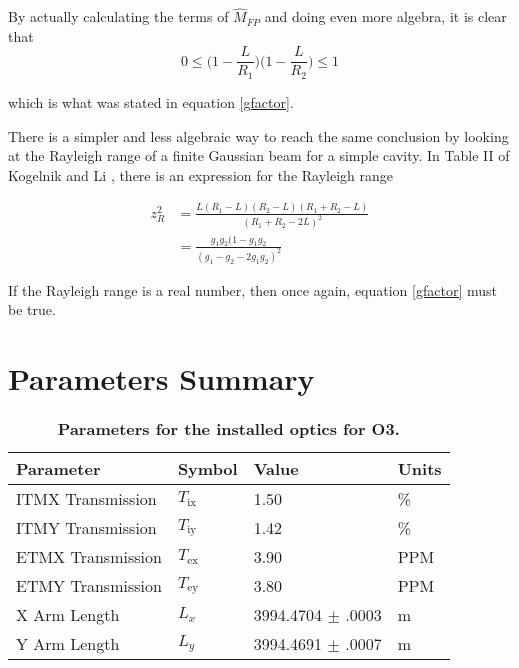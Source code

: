 \begin{appendices}
	By actually calculating the terms of $\hat{M}_{FP}$ and doing even more algebra, it is clear that 
	\begin{equation}
	0 \leq \bigg(1-\frac{L}{R_1}\bigg) \bigg(1-\frac{L}{R_2}\bigg) \leq 1
	\end{equation}
	
	which is what was stated in equation \ref{gfactor}.
	
	There is a simpler and less algebraic way to reach the same conclusion by looking at the Rayleigh range of a finite Gaussian beam for a simple cavity.   In Table II of Kogelnik and Li \cite{Kogelnik}, there is an expression for the Rayleigh range
	
	\begin{equation}
	\begin{aligned}
	z_{R}^2 &= \frac{L (R_1-L) (R_2-L) (R_1+R_2 - L) }  {(R_1+R_2-2L)^2}\\
			&= \frac{g_1 g_2 (1-g_1 g_2}{(g_1 - g_2 - 2 g_1 g_2)^2}
	\end{aligned}
	\end{equation}
	
	If the Rayleigh range is a real number, then once again, equation \ref{gfactor} must be true.
	
	
	\chapter{Parameters Summary}
	
	\begin{table}[h!]
		\centering
		\begin{tabular}{ | l | l | l |l |}
			\hline
			\textbf{Parameter} & \textbf{Symbol} & \textbf{Value} & \textbf{Units} \\ \hline
			ITMX Transmission  & $T_{\text{ix}}$  &1.50                & \%  \\ \hline
			ITMY Transmission  & $T_{\text{iy}}$  &1.42                & \%  \\ \hline
			ETMX Transmission  & $T_{\text{ex}}$  &3.90                & PPM \\ \hline
			ETMY Transmission  & $T_{\text{ey}}$  &3.80                & PPM \\ \hline
			X Arm Length       & $L_x$            &3994.4704 $\pm$ .0003 & m   \\ \hline
			Y Arm Length       & $L_y$            &3994.4691 $\pm$ .0007 & m   \\ \hline   
		\end{tabular}
		\caption[Parameters for the installed optics for O3.]
		{\textbf{Parameters for the installed optics for O3. }
		}
		\label{tbl:LHO_optics}
	\end{table}
	

\end{appendices}
